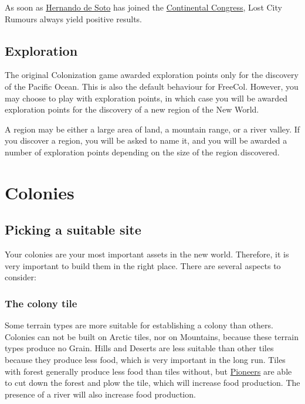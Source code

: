 \documentclass[12pt]{book}
\begin{document}
As soon as \hyperlink{Hernando de Soto}{Hernando de Soto} has joined
the \hyperlink{Continental Congress}{Continental Congress}, Lost City
Rumours always yield positive results.


\hypertarget{Exploration}{\section{Exploration}}

The original Colonization game awarded exploration points only for the
discovery of the Pacific Ocean. This is also the default behaviour for
FreeCol. However, you may choose to play with exploration points, in
which case you will be awarded exploration points for the discovery of
a new region of the New World.

A region may be either a large area of land, a mountain range, or a
river valley. If you discover a region, you will be asked to name it,
and you will be awarded a number of exploration points depending on
the size of the region discovered.


\hypertarget{Colonies}{\chapter{Colonies}}

\hypertarget{Picking a suitable site}{\section{Picking a suitable site}}

Your colonies are your most important assets in the new world.
Therefore, it is very important to build them in the right
place. There are several aspects to consider:

\hypertarget{The colony tile}{\subsection{The colony tile}}

Some terrain types are more suitable for establishing a colony than
others. Colonies can not be built on Arctic tiles, nor on Mountains,
because these terrain types produce no Grain. Hills and Deserts are
less suitable than other tiles because they produce less food, which
is very important in the long run. Tiles with forest generally produce
less food than tiles without, but \hyperlink{Pioneer}{Pioneers} are
able to cut down the forest and plow the tile, which will increase
food production. The presence of a river will also increase food
production.
\end{document}
